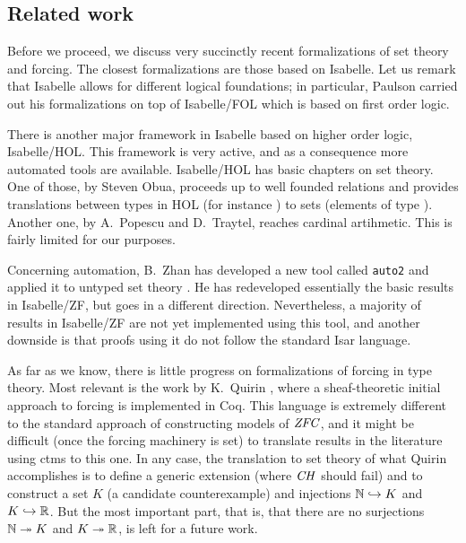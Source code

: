 \subsection{Related work}\label{sec:related-work}
Before we proceed, we discuss very succinctly recent formalizations of
set theory and forcing. The closest formalizations are those based on
Isabelle. Let us remark that Isabelle allows for different logical
foundations; in particular, Paulson carried out his formalizations
on top of Isabelle/FOL which is based on first order logic.

There is another major framework in Isabelle based on higher order
logic, Isabelle/HOL. This framework is very active, and as a 
consequence more automated tools are available. Isabelle/HOL has 
basic chapters on set theory. One of those, by Steven Obua, proceeds up to
well founded relations and provides translations between types in HOL
(for instance ) to  sets  (elements of type
). Another one, by A.~Popescu and D.~Traytel, reaches
cardinal artihmetic. This is fairly limited for our purposes.

Concerning automation, B.~Zhan has developed a new tool called
\texttt{auto2} and applied it to untyped set theory
\cite{10.1007/978-3-319-66107-0_32}. He has redeveloped essentially
the basic results in Isabelle/ZF, but goes in a different
direction. Nevertheless, a majority of results in
Isabelle/ZF are not yet implemented using this tool, and  another
downside is that proofs using it do not follow the standard Isar
language.

As far as we know, there is little progress on formalizations of
forcing in type theory. Most relevant is the work by K.~Quirin
\cite{Quirin}, where a sheaf-theoretic initial approach to forcing is
implemented in Coq. This language is extremely different to the
standard approach of constructing models of $\mathit{ZFC}$, and it might be
difficult (once the forcing machinery is set) to translate results in
the literature using ctms to this one. In any case, the translation to
set theory of what Quirin accomplishes is to define a generic
extension (where $\mathit{CH}$ should fail) and to construct a set $K$ (a
candidate counterexample) and injections $\mathbb{N}\hookrightarrow K$ and
$K\hookrightarrow\mathbb{R}$. But the most important part, that is, that there
are no surjections $\mathbb{N}\twoheadrightarrow K$ and
$K\twoheadrightarrow\mathbb{R}$, is left for a future
work. %

